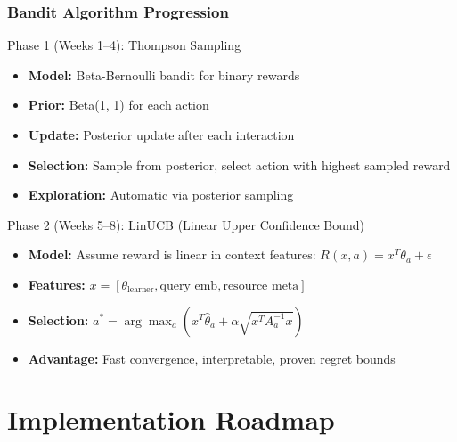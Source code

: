 \documentclass[aspectratio=169]{beamer}
\begin{document}
\begin{frame}
\frametitle{Bandit Algorithm Progression}
\begin{block}{Phase 1 (Weeks 1--4): Thompson Sampling}
\begin{itemize}
\item \textbf{Model:} Beta-Bernoulli bandit for binary rewards
\item \textbf{Prior:} Beta(1, 1) for each action
\item \textbf{Update:} Posterior update after each interaction
\item \textbf{Selection:} Sample from posterior, select action with highest sampled reward
\item \textbf{Exploration:} Automatic via posterior sampling
\end{itemize}
\end{block}

\begin{block}{Phase 2 (Weeks 5--8): LinUCB (Linear Upper Confidence Bound)}
\begin{itemize}
\item \textbf{Model:} Assume reward is linear in context features: $R(x, a) = x^T \theta_a + \epsilon$
\item \textbf{Features:} $x = [\theta_{\text{learner}}, \text{query\_emb}, \text{resource\_meta}]$
\item \textbf{Selection:} $a^* = \arg\max_a \left( x^T \hat{\theta}_a + \alpha \sqrt{x^T A_a^{-1} x} \right)$
\item \textbf{Advantage:} Fast convergence, interpretable, proven regret bounds
\end{itemize}
\end{block}
\end{frame}

\section{Implementation Roadmap}
\end{document}
